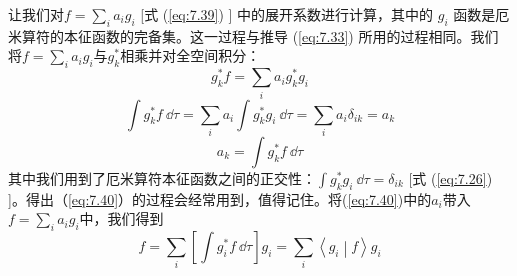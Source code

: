     让我们对$f=\sum_{i}a_ig_i$ [式 (\ref{eq:7.39}) ] 中的展开系数进行计算，其中的 $g_i$ 函数是厄米算符的本征函数的完备集。这一过程与推导 (\ref{eq:7.33}) 所用的过程相同。我们将$f = \sum_{i}a_ig_i$与$g_k^{\ast}$相乘并对全空间积分：
    \begin{equation*}
        g_k^{\ast} f = \sum_{i} a_i g_k^{\ast} g_i
    \end{equation*}
    \begin{equation*}
        \int g_k^{\ast} f \:\dd \tau = \sum_{i} a_i \int g_k^{\ast} g_i \:\dd \tau = \sum_{i} a_i \delta_{ik} = a_k
    \end{equation*}
    \begin{equation}
        a_k = \int g_k^{\ast} f \:\dd \tau
        \label{eq:7.40}
    \end{equation}
    其中我们用到了厄米算符本征函数之间的正交性：$\int g_k^{\ast} g_i \:\dd \tau = \delta_{ik}$ [式 (\ref{eq:7.26}) ]。得出（\ref{eq:7.40}）的过程会经常用到，值得记住。将(\ref{eq:7.40})中的$a_i$带入$f = \sum_{i}a_ig_i$中，我们得到
    \begin{equation}
        f = \sum_{i}\left[\int g_i^{\ast}f \:\dd \tau\right]g_i = \sum_{i}\left\langle g_i \middle| f \right\rangle g_i
        \label{eq:7.41}
    \end{equation}

